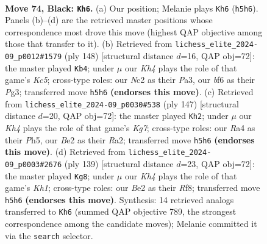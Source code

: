 \documentclass[11pt]{article}
\begin{document}
\clearpage

\begin{figure}[p]\centering
\begin{subfigure}{0.46\textwidth}\centering
\resizebox{\linewidth}{!}{%
\newchessgame
\chessboard[
  setfen={8/8/5B2/6Rk/r7/7K/2n1bP2/8 b - - 9 74},
  showmover=false,
  pgfstyle=straightmove, color=movearrow, markmove={h5-h6}
]}
\caption{}
\end{subfigure}\hfill
\begin{subfigure}{0.46\textwidth}\centering
\resizebox{\linewidth}{!}{%
\newchessgame
\chessboard[
  setfen={8/8/4k3/2Kr4/8/P3B1Pb/8/8 w - - 8 75},
  showmover=false,
  pgfstyle=straightmove, color=movearrow, markmove={c5-b4}
]}
\caption{}
\end{subfigure}
\\[4pt]
\begin{subfigure}{0.46\textwidth}\centering
\resizebox{\linewidth}{!}{%
\newchessgame
\chessboard[
  setfen={8/8/8/7p/3B1K2/6R1/r5k1/8 b - - 17 74},
  showmover=false,
  pgfstyle=straightmove, color=movearrow, markmove={g2-h2}
]}
\caption{}
\end{subfigure}\hfill
\begin{subfigure}{0.46\textwidth}\centering
\resizebox{\linewidth}{!}{%
\newchessgame
\chessboard[
  setfen={5r1k/7R/6K1/8/6P1/8/8/8 b - - 2 70},
  showmover=false,
  pgfstyle=straightmove, color=movearrow, markmove={h8-g8}
]}
\caption{}
\end{subfigure}
\caption{\textbf{Move 74, Black: \texttt{Kh6}.} (a) Our position; Melanie plays \texttt{Kh6} (\texttt{h5h6}). Panels (b)--(d) are the retrieved master positions whose correspondence most drove this move (highest QAP objective among those that transfer to it). (b) Retrieved from \texttt{lichess\_elite\_2024-09\_p0012\#1579} (ply 148) [structural distance $d$=16, QAP obj=72]: the master played \texttt{Kb4}; under $\mu$ our \emph{Kh4} plays the role of that game's \emph{Kc5}; cross-type roles: our \emph{N}c2 as their \emph{P}a3, our \emph{b}f6 as their \emph{P}g3; transferred move \texttt{h5h6} \textbf{(endorses this move)}. (c) Retrieved from \texttt{lichess\_elite\_2024-09\_p0030\#538} (ply 147) [structural distance $d$=20, QAP obj=72]: the master played \texttt{Kh2}; under $\mu$ our \emph{Kh4} plays the role of that game's \emph{Kg7}; cross-type roles: our \emph{R}a4 as their \emph{P}h5, our \emph{B}e2 as their \emph{R}a2; transferred move \texttt{h5h6} \textbf{(endorses this move)}. (d) Retrieved from \texttt{lichess\_elite\_2024-09\_p0003\#2676} (ply 139) [structural distance $d$=23, QAP obj=72]: the master played \texttt{Kg8}; under $\mu$ our \emph{Kh4} plays the role of that game's \emph{Kh1}; cross-type roles: our \emph{B}e2 as their \emph{R}f8; transferred move \texttt{h5h6} \textbf{(endorses this move)}. Synthesis: 14 retrieved analogs transferred to \texttt{Kh6} (summed QAP objective 789, the strongest correspondence among the candidate moves); Melanie committed it via the \texttt{search} selector.}
\label{fig:thought-m147}
\end{figure}
\end{document}
